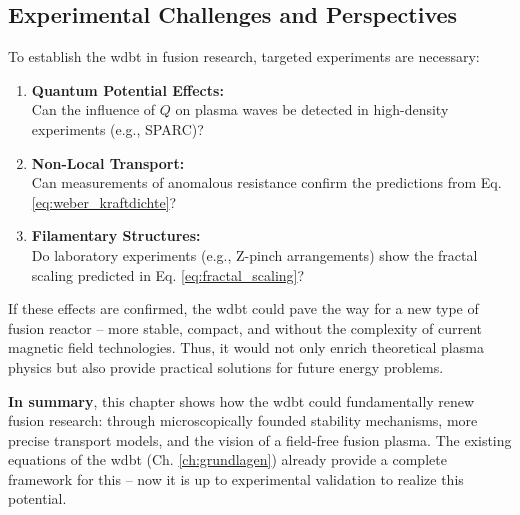 \subsection{Experimental Challenges and Perspectives}
To establish the \gls{wdbt} in fusion research, targeted experiments are necessary:

\begin{enumerate}
    \item \textbf{Quantum Potential Effects:}\\Can the influence of $Q$ on plasma waves be detected in high-density experiments (e.g., SPARC)?
    \item \textbf{Non-Local Transport:}\\Can measurements of anomalous resistance confirm the predictions from Eq. \ref{eq:weber_kraftdichte}?
    \item \textbf{Filamentary Structures:}\\Do laboratory experiments (e.g., Z-pinch arrangements) show the fractal scaling predicted in Eq. \ref{eq:fractal_scaling}?
\end{enumerate}

If these effects are confirmed, the \gls{wdbt} could pave the way for a new type of fusion reactor – more stable, compact, and without the complexity of current magnetic field technologies. Thus, it would not only enrich theoretical plasma physics but also provide practical solutions for future energy problems.

\textbf{In summary}, this chapter shows how the \gls{wdbt} could fundamentally renew fusion research: through microscopically founded stability mechanisms, more precise transport models, and the vision of a field-free fusion plasma. The existing equations of the \gls{wdbt} (Ch. \ref{ch:grundlagen}) already provide a complete framework for this – now it is up to experimental validation to realize this potential.